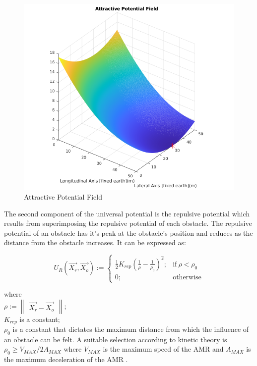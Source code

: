\documentclass[a4paper, twocolumn]{article}
\begin{document}
\begin{figure}
    \centering
    \includegraphics[scale=0.45]{presentation/img/u_att.png}
    \caption{Attractive Potential Field}
    \label{fig:u_att}
\end{figure}


The second component of the universal potential is the repulsive potential which results from superimposing 
the repulsive potential of each obstacle. The repulsive potential of an obstacle has it's peak at the obstacle's position and reduces as the 
distance from the obstacle increases. It can be expressed as: 



$$
    U_{R}(\vec{X_{r}}, \vec{X_{o}}):= 
    \begin{cases}
        \frac{1}{2} K_{rep} {\left( \frac{1}{\rho} 
        - \frac{1}{\rho_{0}} \right)}^{2}; &   \text{if}\ \rho < \rho_{0} \\

        0; & \text{otherwise} 
    \end{cases}
$$

\noindent
where \\
$\rho := \begin{Vmatrix}\vec{X_{r}} - \vec{X_{o}}\end{Vmatrix}$; \\
$K_{rep}$ is a constant; \\
$\rho_{0}$ is a constant that dictates the maximum distance from which the influence of an obstacle can be felt.
\noindent
A suitable selection according to kinetic theory is $\rho_{0} \geq V_{MAX}/2 A_{MAX}$ where $V_{MAX}$ is the 
maximum speed of the AMR and $A_{MAX}$ is the maximum deceleration of the AMR \cite{rostami1}.\\
\end{document}
